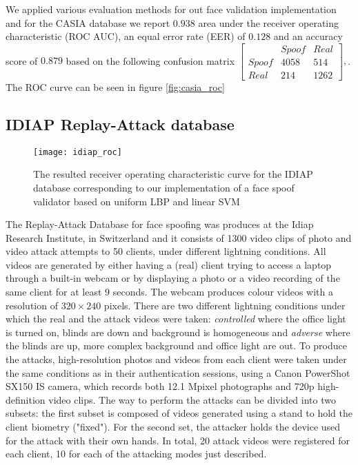 We applied various evaluation methods for out face validation implementation and for the CASIA database we report $0.938$ area under the receiver operating characteristic (ROC AUC), an equal error rate (EER) of $0.128$ and an accuracy score of $0.879$ based on the following confusion matrix
$
[
\begin{smallmatrix}
&Spoof & Real\\
Spoof & 4058 & 514\\
Real & 214 & 1262
\end{smallmatrix}], 
$. The ROC curve can be seen in figure \ref{fig:casia_roc}
\subsection{IDIAP Replay-Attack database}
\begin{figure}
	\captionsetup{width=15cm,font=small}
	\begin{center}
			\texttt{[image: idiap\_roc]}
	\end{center}
	\caption[IDIAP database resulted ROC curve]{The resulted receiver operating characteristic curve for the IDIAP database corresponding to our implementation of a face spoof validator based on uniform LBP and linear SVM}
	\label{fig:idiap_roc}
\end{figure}
The Replay-Attack Database for face spoofing was produces at the Idiap Research Institute, in Switzerland and it consists of 1300 video clips of photo and video attack attempts to 50 clients, under different lightning conditions. All videos are generated by either having a (real) client trying to access a laptop through a built-in webcam or by displaying a photo or a video recording of the same client for at least 9 seconds. The webcam produces colour videos with a resolution of $320\times240$ pixels. 
There are two different lightning conditions under which the real and the attack videos were taken: \textit{controlled} where the office light is turned on, blinds are down and background is homogeneous and \textit{adverse} where the blinds are up, more complex background and office light are out. To produce the attacks, high-resolution photos and videos from each client were taken under the same conditions as in their authentication sessions, using a Canon PowerShot SX150 IS camera, which records both 12.1 Mpixel photographs and 720p high-definition video clips. The way to perform the attacks can be divided into two subsets: the first subset is composed of videos generated using a stand to hold the client biometry ("fixed"). For the second set, the attacker holds the device used for the attack with their own hands. In total, 20 attack videos were registered for each client, 10 for each of the attacking modes just described.

